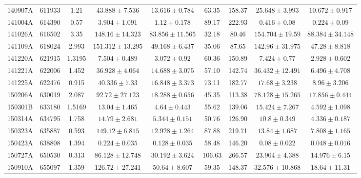 \documentclass[prd,nofootinbib,preprintnumbers,floatfix]{revtex4}  %
\begin{document}
\begin{center}
\begin{longtable*}{|c|c|c|c|c|c|c|c|c|}
140907A	&	611933	&	1.21	&	$	43.888	\pm	7.536	$	&	$	13.616	\pm	0.784	$	&	63.35	&	158.37	&	$	25.648	\pm	3.993	$	&	$	10.672	\pm	0.917	$	\\
141004A	&	614390	&	0.57	&	$	3.904	\pm	1.091	$	&	$	1.12	\pm	0.178	$	&	89.17	&	222.93	&	$	0.416	\pm	0.08	$	&	$	0.224	\pm	0.09	$	\\
141026A	&	616502	&	3.35	&	$	148.16	\pm	14.323	$	&	$	83.856	\pm	11.565	$	&	32.18	&	80.46	&	$	154.704	\pm	19.59	$	&	$	88.384	\pm	34.148	$	\\
141109A	&	618024	&	2.993	&	$	151.312	\pm	13.295	$	&	$	49.168	\pm	6.437	$	&	35.06	&	87.65	&	$	142.96	\pm	31.975	$	&	$	47.28	\pm	8.818	$	\\
141220A	&	621915	&	1.3195	&	$	7.504	\pm	0.489	$	&	$	3.072	\pm	0.92	$	&	60.36	&	150.89	&	$	7.424	\pm	0.77	$	&	$	2.928	\pm	0.602	$	\\
141221A	&	622006	&	1.452	&	$	36.928	\pm	4.064	$	&	$	14.688	\pm	3.075	$	&	57.10	&	142.74	&	$	36.432	\pm	12.491	$	&	$	6.496	\pm	4.708	$	\\
141225A	&	622476	&	0.915	&	$	40.336	\pm	7.33	$	&	$	16.848	\pm	3.373	$	&	73.11	&	182.77	&	$	17.68	\pm	3.238	$	&	$	8.96	\pm	3.206	$	\\
150206A	&	630019	&	2.087	&	$	92.72	\pm	27.123	$	&	$	18.288	\pm	0.656	$	&	45.35	&	113.38	&	$	78.128	\pm	15.265	$	&	$	17.856	\pm	0.444	$	\\
150301B	&	633180	&	1.5169	&	$	13.04	\pm	1.465	$	&	$	4.64	\pm	0.443	$	&	55.62	&	139.06	&	$	15.424	\pm	7.267	$	&	$	4.592	\pm	1.098	$	\\
150314A	&	634795	&	1.758	&	$	14.79	\pm	2.681	$	&	$	5.344	\pm	0.151	$	&	50.76	&	126.90	&	$	10.8	\pm	0.349	$	&	$	4.336	\pm	0.187	$	\\
150323A	&	635887	&	0.593	&	$	149.12	\pm	6.815	$	&	$	12.928	\pm	1.264	$	&	87.88	&	219.71	&	$	13.84	\pm	1.687	$	&	$	7.808	\pm	1.165	$	\\
150423A	&	638808	&	1.394	&	$	0.224	\pm	0.035	$	&	$	0.128	\pm	0.035	$	&	58.48	&	146.20	&	$	0.08	\pm	0.022	$	&	$	0.048	\pm	0.016	$	\\
150727A	&	650530	&	0.313	&	$	86.128	\pm	12.748	$	&	$	30.192	\pm	3.624	$	&	106.63	&	266.57	&	$	23.904	\pm	4.388	$	&	$	14.976	\pm	6.15	$	\\
150910A	&	655097	&	1.359	&	$	126.72	\pm	27.241	$	&	$	50.64	\pm	8.607	$	&	59.35	&	148.37	&	$	32.576	\pm	10.868	$	&	$	18.64	\pm	11.31	$	\\

\end{longtable*}
\end{center}
\end{document}
